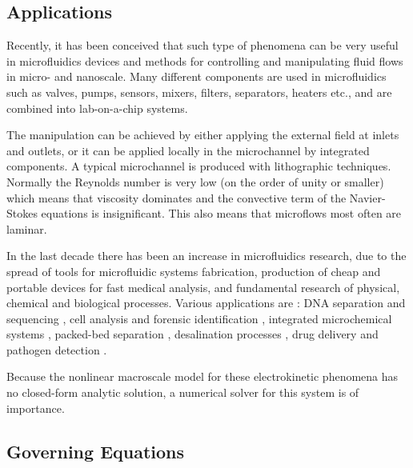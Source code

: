 \documentclass[preprint,10pt]{elsarticle}
\begin{document}
\subsection{Applications}

Recently, it has been conceived that such type of phenomena
can be very useful in microfluidics
devices and methods for controlling and manipulating fluid flows in micro- and nanoscale. 
Many different components are used in microfluidics such as valves, pumps, sensors, mixers, 
filters, separators, heaters etc., and are combined into lab-on-a-chip systems.

The manipulation can be achieved by either applying the external field at inlets and outlets, or it can be applied locally in the microchannel by integrated components.
A typical microchannel is produced with lithographic techniques. Normally the Reynolds
number is very low (on the order of unity or smaller) which means that viscosity dominates
and the convective term of the Navier-Stokes equations is insignificant. This also means that
microflows most often are laminar.

In the last decade there has been an increase in microfluidics research, 
due to the spread of tools for microfluidic systems fabrication, 
production of cheap and portable devices for fast medical analysis, 
and fundamental research of physical, chemical and biological processes.
Various applications are \cite{whitesides2006origins, erickson2004integrated, squires2005microfluidics, hardt2007microfluidic}:
DNA separation and sequencing \cite{wainright2003preconcentration},
cell analysis and forensic identification \cite{wu2004chemical, weinberger1993practical, horsman2007forensic},
integrated microchemical systems \cite{kothare2006dynamics},
packed-bed separation \cite{leinweber2004, losey2001microfabricated},
desalination processes \cite{kim2010direct},
drug delivery and pathogen detection \cite{santini2000microchips}.


Because the nonlinear macroscale model for these electrokinetic
phenomena has no closed-form analytic solution, a numerical
solver for this system is of importance.

\subsection{Governing Equations} \label{sec:equations}
\end{document}
